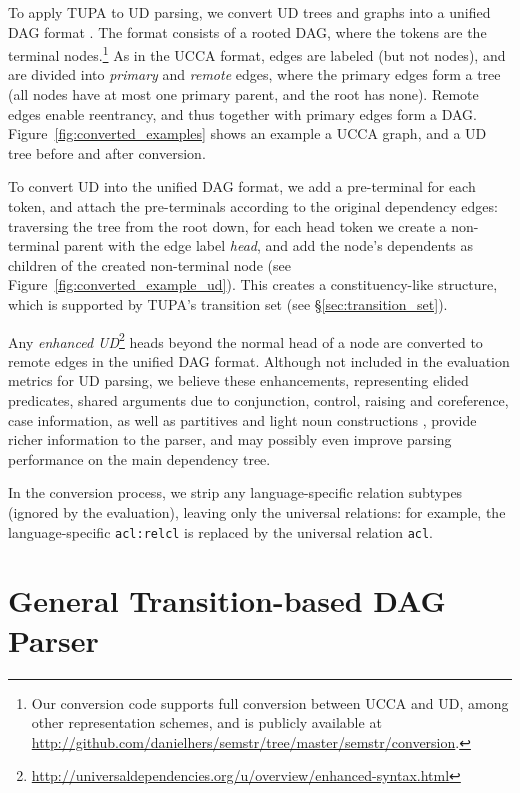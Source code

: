 \documentclass[11pt,a4paper]{article}
\begin{document}
To apply TUPA to UD parsing,
we convert UD trees and graphs into a unified DAG format \cite{hershcovich2018multitask}.
The format consists of a rooted DAG, where the tokens are the terminal
nodes.\footnote{Our conversion code supports full conversion between UCCA and UD,
among other representation schemes,
and is publicly available at \url{http://github.com/danielhers/semstr/tree/master/semstr/conversion}.}
As in the UCCA format, edges are labeled (but not nodes),
and are divided into \textit{primary} and \textit{remote} edges,
where the primary edges form a tree (all nodes have at most one primary parent,
and the root has none).
Remote edges enable reentrancy, and thus together with primary edges
form a DAG.
Figure~\ref{fig:converted_examples} shows an example a UCCA graph,
and a UD tree before and after conversion.

To convert UD into the unified DAG format,
we add a pre-terminal for each token,
and attach the pre-terminals according to the original dependency edges:
traversing the tree from the root down, for each head token we create a non-terminal
parent with the edge label {\it head},
and add the node's dependents as children of the created non-terminal node
(see Figure~\ref{fig:converted_example_ud}).
This creates a constituency-like structure,
which is supported by TUPA's transition set (see \S\ref{sec:transition_set}).

Any \textit{enhanced UD}\footnote{\url{http://universaldependencies.org/u/overview/enhanced-syntax.html}}
heads beyond the normal head of a node are converted to remote edges in the unified DAG format.
Although not included in the evaluation metrics for UD parsing,
we believe these enhancements, representing elided predicates,
shared arguments due to conjunction, control, raising and coreference,
case information,
as well as partitives and light noun constructions \cite{SCHUSTER16.779},
provide richer information to the parser, and may possibly even improve parsing performance
on the main dependency tree.

In the conversion process, we strip any language-specific relation subtypes
(ignored by the evaluation),
leaving only the universal relations:
for example, the language-specific \verb|acl:relcl| is replaced by the universal relation \verb|acl|.


\section{General Transition-based DAG Parser}\label{sec:model}
\end{document}
